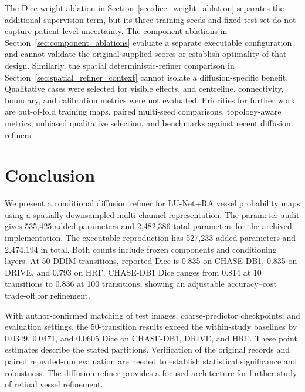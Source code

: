 \documentclass[jimaging,article,submit,pdftex,moreauthors]{Definitions/mdpi}%
\begin{document}
The Dice-weight ablation in Section~\ref{sec:dice_weight_ablation} separates the additional supervision term, but its three training seeds and fixed test set do not capture patient-level uncertainty. The component ablations in Section~\ref{sec:component_ablations} evaluate a separate executable configuration and cannot validate the original supplied scores or establish optimality of that design. Similarly, the spatial deterministic-refiner comparison in Section~\ref{sec:spatial_refiner_context} cannot isolate a diffusion-specific benefit. Qualitative cases were selected for visible effects, and centreline, connectivity, boundary, and calibration metrics were not evaluated. Priorities for further work are out-of-fold training maps, paired multi-seed comparisons, topology-aware metrics, unbiased qualitative selection, and benchmarks against recent diffusion refiners.








\section{Conclusion}

\label{sec:conclusion}



We present a conditional diffusion refiner for LU-Net+RA vessel probability maps using a spatially downsampled multi-channel representation. The parameter audit gives 535,425 added parameters and 2,482,386 total parameters for the archived implementation. The executable reproduction has 527,233 added parameters and 2,474,194 in total. Both counts include frozen components and conditioning layers. At 50 DDIM transitions, reported Dice is 0.835 on CHASE-DB1, 0.835 on DRIVE, and 0.793 on HRF. CHASE-DB1 Dice ranges from 0.814 at 10 transitions to 0.836 at 100 transitions, showing an adjustable accuracy--cost trade-off for refinement.



With author-confirmed matching of test images, coarse-predictor checkpoints, and evaluation settings, the 50-transition results exceed the within-study baselines by 0.0349, 0.0471, and 0.0605 Dice on CHASE-DB1, DRIVE, and HRF. These point estimates describe the stated partitions. Verification of the original records and paired repeated-run evaluation are needed to establish statistical significance and robustness. The diffusion refiner provides a focused architecture for further study of retinal vessel refinement.
\end{document}
